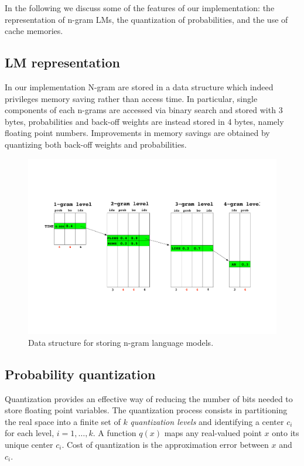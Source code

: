 \documentclass[10pt]{report}
\theoremstyle{plain}
\begin{document}
{In the following we discuss some of the features of our implementation: the representation of 
n-gram LMs, the quantization of probabilities, and  the use of cache memories. 

\subsection{LM representation}
In our implementation N-gram are stored in a data structure which indeed privileges memory
saving rather than access time.  In particular, single components of each n-grams are accessed 
via binary search and stored with 3 bytes, probabilities and back-off weights are instead stored
in 4 bytes, namely  floating point numbers. Improvements in memory savings are obtained by 
quantizing both back-off weights and probabilities. 

\begin{figure}
\begin{center}
\label{fig:LM-struct}
\caption{Data structure for storing n-gram language models.}
 \includegraphics[width=\columnwidth]{marcello-lmstruct}
\end{center}
 \end{figure}


\subsection{Probability quantization}

Quantization provides an effective way of reducing the number of bits
needed to store floating point variables. The quantization process
consists in partitioning the real space into a finite set of $k$ {\em
quantization levels} and identifying a center $c_i$ for each level,
$i=1,\ldots, k$. A function $q(x)$ maps any real-valued point $x$ onto
its unique center $c_i$.  Cost of quantization is the approximation
error between $x$ and $c_i$. 

}
\end{document}
